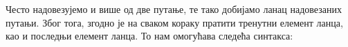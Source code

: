 Често надовезујемо и више од две путање, те тако добијамо ланац надовезаних путањи. Због тога, згодно је на сваком кораку пратити тренутни елемент ланца, као и последњи елемент ланца. То нам омогућава следећа синтакса:
\begin{code}%
\>[0]\AgdaSpace{}%
\AgdaSymbol{:}\AgdaSpace{}%
\AgdaSymbol{\{}\AgdaSpace{}%
\AgdaSymbol{:}\AgdaSpace{}%
\AgdaSpace{}%
\AgdaSpace{}%
\AgdaSymbol{\}}\AgdaSpace{}%
\AgdaSymbol{(}\AgdaSpace{}%
\AgdaSymbol{:}\AgdaSpace{}%
\AgdaSymbol{)}\AgdaSpace{}%
\AgdaSymbol{\{}\AgdaSpace{}%
\AgdaSpace{}%
\AgdaSymbol{:}\AgdaSpace{}%
\AgdaSymbol{\}}\AgdaSpace{}%
\AgdaSpace{}%
\AgdaSpace{}%
\AgdaOperator{\AgdaFunction{==}}\AgdaSpace{}%
\AgdaSpace{}%
\AgdaSpace{}%
\AgdaSpace{}%
\AgdaOperator{\AgdaFunction{==}}\AgdaSpace{}%
\AgdaSpace{}%
\AgdaSpace{}%
\AgdaSpace{}%
\AgdaOperator{\AgdaFunction{==}}\AgdaSpace{}%
\<%
\\
\>[0]\AgdaSpace{}%
\AgdaSpace{}%
\AgdaSpace{}%
\AgdaSpace{}%
\AgdaSpace{}%
\AgdaSymbol{=}\AgdaSpace{}%
\AgdaSpace{}%
\AgdaSpace{}%
\<%
\\
%
\\[\AgdaEmptyExtraSkip]%
\>[0]\AgdaSpace{}%
\AgdaSymbol{:}\AgdaSpace{}%
\AgdaSymbol{\{}\AgdaSpace{}%
\AgdaSymbol{:}\AgdaSpace{}%
\AgdaSpace{}%
\AgdaSpace{}%
\AgdaSymbol{\}}\AgdaSpace{}%
\AgdaSymbol{(}\AgdaSpace{}%
\AgdaSymbol{:}\AgdaSpace{}%
\AgdaSymbol{)}\AgdaSpace{}%
\AgdaSpace{}%
\AgdaSpace{}%
\AgdaOperator{\AgdaFunction{==}}\AgdaSpace{}%
\<%
\\
\>[0]\AgdaSpace{}%
\AgdaSpace{}%
\AgdaSymbol{=}\AgdaSpace{}%
\AgdaSpace{}%
\<%
\end{code}

